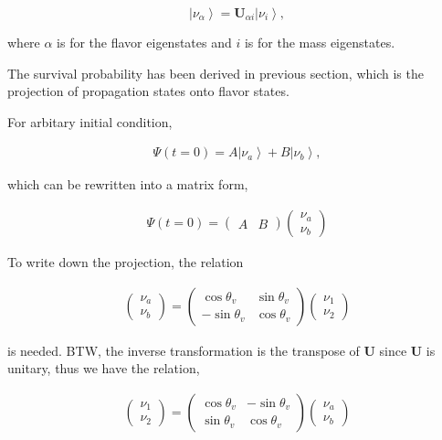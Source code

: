 \documentclass{tufte-handout}
\newcommand{\ket}[1]{\left| #1\right\rangle}
\begin{document}
\begin{equation}
\ket{\nu_{\alpha}} = \mathbf U_{\alpha i} \ket{\nu_i},
\end{equation}

where $\alpha$ is for the flavor eigenstates and $i$ is for the mass eigenstates.

The survival probability has been derived in previous section, which is the projection of propagation states onto flavor states.

For arbitary initial condition,

\begin{align}
    \Psi(t=0)= A \ket{\nu_a} + B \ket{\nu_b}, 
\end{align}

which can be rewritten into a matrix form,

\begin{align}
    \Psi(t=0) = \begin{pmatrix}
    A & B 
\end{pmatrix}\begin{pmatrix}
    \nu_a \\
    \nu_b 
\end{pmatrix}
\end{align}



To write down the projection, the relation

\begin{align}
    \begin{pmatrix}
        \nu_a \\
        \nu_b
    \end{pmatrix} = \begin{pmatrix}
        \cos\theta_v & \sin\theta_v \\ -\sin\theta_v  & \cos\theta_v
\end{pmatrix} \begin{pmatrix}  \nu_1 \\ \nu_2
\end{pmatrix}
\end{align}

is needed. BTW, the inverse transformation is the transpose of $\mathbf U$ since $\mathbf U$ is unitary, thus we have the relation,

\begin{align}
\begin{pmatrix}
    \nu_1 \\
    \nu_2
\end{pmatrix} = \begin{pmatrix}
\cos\theta_v & -\sin\theta_v \\
\sin\theta_v & \cos\theta_v
\end{pmatrix} \begin{pmatrix}
    \nu_a \\
    \nu_b
\end{pmatrix}
\end{align}
\end{document}
